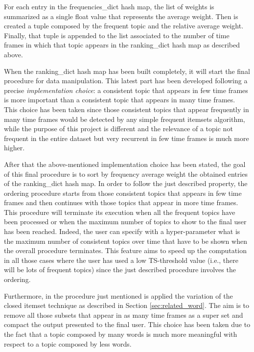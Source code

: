 \noindent For each entry in the frequencies\_dict hash map, the list of weights is summarized as a single float value that represents the average weight. Then is created a tuple composed by the frequent topic and the relative average weight. Finally, that tuple is appended to the list associated to the number of time frames in which that topic appears in the ranking\_dict hash map as described above. 

When the ranking\_dict hash map has been built completely, it will start the final procedure for data manipulation. This latest part has been developed following a precise \textit{implementation choice}: a consistent topic that appears in few time frames is more important than a consistent topic that appears in many time frames. This choice has been taken since those consistent topics that appear frequently in many time frames would be detected by any simple frequent itemsets algorithm, while the purpose of this project is different and the relevance of a topic not frequent in the entire dataset but very recurrent in few time frames is much more higher.

\noindent After that the above-mentioned implementation choice has been stated, the goal of this final procedure is to sort by frequency average weight the obtained entries of the ranking\_dict hash map. In order to follow the just described property, the ordering procedure starts from those consistent topics that appears in few time frames and then continues with those topics that appear in more time frames. This procedure will terminate its execution when all the frequent topics have been processed or when the maximum number of topics to show to the final user has been reached. Indeed, the user can specify with a hyper-parameter what is the maximum number of consistent topics over time that have to be shown when the overall procedure terminates. This feature aims to speed up the computation in all those cases where the user has used a low TS-threshold value (i.e., there will be lots of frequent topics) since the just described procedure involves the ordering.

\noindent Furthermore, in the procedure just mentioned is applied the variation of the closed itemset technique as described in Section \ref{sec:related_word}. The aim is to remove all those subsets that appear in as many time frames as a super set and compact the output presented to the final user. This choice has been taken due to the fact that a topic composed by many words is much more meaningful with respect to a topic composed by less words.

